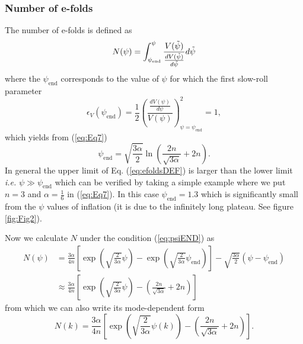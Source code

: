 \documentclass[a4paper,11pt]{article}
\begin{document}
\subsubsection{Number of e-folds}
The number of e-folds is defined as
\begin{equation}
    N(\psi)=\int_{\psi_{\mathrm{end}}}^{\psi}\frac{V(\Tilde{\psi})}{\frac{dV(\Tilde{\psi})}{d\Tilde{\psi}}}d\Tilde{\psi}
    \label{eq:efoldsDEF}
\end{equation}
where the $\psi_{\mathrm{end}}$ corresponds to the value of $\psi$ for which the first slow-roll parameter
\begin{equation}
    \epsilon_V(\psi_{\mathrm{end}})=\frac{1}{2}\left(\frac{\frac{dV(\psi)}{d\psi}}{V(\psi)}\right)_{\psi=\psi_{\mathrm{end}}}^2=1,
\end{equation}
which yields from (\ref{eq:Eq7})
\begin{equation}
    \psi_{\mathrm{end}}=\sqrt{\frac{3\alpha}{2}}\ln{\left(\frac{2n}{\sqrt{3\alpha}}+2n\right)}.
    \label{eq:psiEND}
\end{equation}
In general the upper limit of Eq. (\ref{eq:efoldsDEF}) is larger than the lower limit \textit{i.e.} $\psi\gg\psi_{\mathrm{end}}$ which can be verified by taking a simple example where we put $n=3$ and $\alpha=\frac{1}{6}$ in (\ref{eq:Eq7}). In this case $\psi_{\mathrm{end}}=1.3$ which is significantly small from the $\psi$ values of inflation (it is due to the infinitely long plateau. See figure \ref{fig:Fig2}).\par Now we calculate $N$ under the condition (\ref{eq:psiEND}) as
\begin{equation}
\begin{split}
    N(\psi)&=\frac{3\alpha}{4n}\left[\exp\left(\sqrt{\frac{2}{3\alpha}}\psi\right)-\exp\left(\sqrt{\frac{2}{3\alpha}}\psi_{\mathrm{end}}\right)\right]-\sqrt{\frac{3\alpha}{2}}\left(\psi-\psi_{\mathrm{end}}\right)\\
    &\approx \frac{3\alpha}{4n}\left[\exp\left(\sqrt{\frac{2}{3\alpha}}\psi\right)-\left(\frac{2n}{\sqrt{3\alpha}}+2n\right)\right]
\end{split}
\label{eq:finalEFOLDS}
\end{equation}
from which we can also write its mode-dependent form
\begin{equation}
    N(k)=\frac{3\alpha}{4n}\left[\exp\left(\sqrt{\frac{2}{3\alpha}}\psi(k)\right)-\left(\frac{2n}{\sqrt{3\alpha}}+2n\right)\right].
    \label{eq:modeEFOLDS}
\end{equation}
\end{document}
